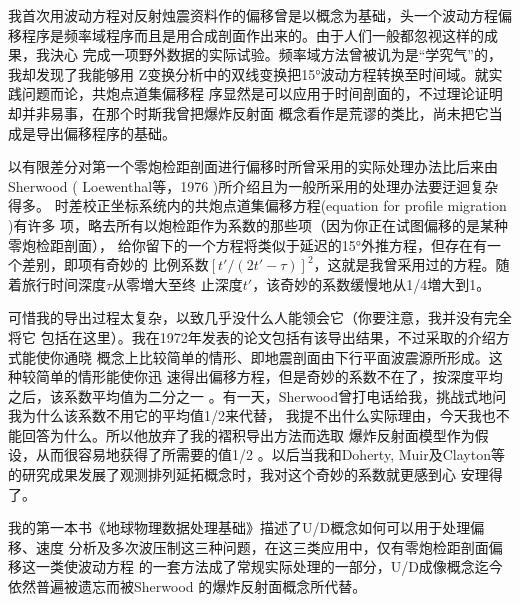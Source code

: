 我首次用波动方程对反射烛震资料作的偏移曾是以概念为基础，头一个波动方程偏
移程序是频率域程序而且是用合成剖面作出来的。由于人们一般都忽视这样的成果，我決心
完成一项野外数据的实际试验。频率域方法曾被讥为是“学究气”的，我却发现了我能够用
Z变换分析中的双线变换把15°波动方程转换至时间域。就实践问题而论，共炮点道集偏移程
序显然是可以应用于时间剖面的，不过理论证明却并非易事，在那个时斯我曾把爆炸反射面
概念看作是荒谬的类比，尚未把它当成是导出偏移程序的基础。

以有限差分对第一个零炮检距剖面进行偏移时所曾采用的实际处理办法比后来由
Sherwood ( Loewenthal等，1976
)所介绍且为一般所采用的处理办法要迂迴复杂得多。
时差校正坐标系统内的共炮点道集偏移方程(equation for profile migration )有许多
项，略去所有以炮检距作为系数的那些项（因为你正在试图偏移的是某种零炮检距剖面），
给你留下的一个方程将类似于延迟的15°外推方程，但存在有一个差别，即项有奇妙的
比例系数$[t'/(2t'-\tau)]^2$，这就是我曾采用过的方程。随着旅行时间深度$\tau$从零増大至终
止深度$t'$，该奇妙的系数缓慢地从1/4増大到1。

可惜我的导出过程太复杂，以致几乎没什么人能领会它（你要注意，我并没有完全将它
包括在这里）。我在1972年发表的论文包括有该导出结果，不过采取的介绍方式能使你通晓
概念上比较简单的情形、即地震剖面由下行平面波震源所形成。这种较简单的情形能使你迅
速得出偏移方程，但是奇妙的系数不在了，按深度平均之后，该系数平均值为二分之一
。有一天，Sherwood曾打电话给我，挑战式地问我为什么该系数不用它的平均值1/2来代替，
我提不出什么实际理由，今天我也不能回答为什么。所以他放弃了我的褶积导出方法而选取
爆炸反射面模型作为假设，从而很容易地获得了所需要的值1/2
。以后当我和Doherty,
Muir及Clayton等的研究成果发展了观测排列延拓概念时，我对这个奇妙的系数就更感到心
安理得了。

我的第一本书《地球物理数据处理基础》描述了U/D概念如何可以用于处理偏移、速度
分析及多次波压制这三种问题，在这三类应用中，仅有零炮检距剖面偏移这一类使波动方程
的一套方法成了常规实际处理的一部分，U/D成像概念迄今依然普遍被遗忘而被Sherwood
的爆炸反射面概念所代替。


